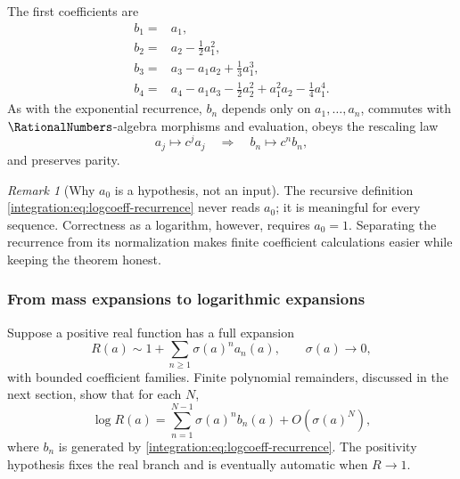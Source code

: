 \documentclass[11pt,oneside]{article}
\theoremstyle{definition}
\theoremstyle{remark}
\newtheorem{remark}[remark]{Remark}
\begin{document}
The first coefficients are
\begin{align}
 b_1={}&a_1,                                                  \label{integration:eq:b1}\\
 b_2={}&a_2-\frac12a_1^2,                                   \label{integration:eq:b2}\\
 b_3={}&a_3-a_1a_2+\frac13a_1^3,                            \label{integration:eq:b3}\\
 b_4={}&a_4-a_1a_3-\frac12a_2^2+a_1^2a_2-\frac14a_1^4.     \label{integration:eq:b4}
\end{align}
As with the exponential recurrence, $b_n$ depends only on $a_1,\ldots,a_n$, commutes with
$\RationalNumbers$-algebra morphisms and evaluation, obeys the rescaling law
\begin{equation}
 a_j\mapsto c^ja_j\quad\Longrightarrow\quad b_n\mapsto c^nb_n,
 \label{integration:eq:logcoeff-rescale}
\end{equation}
and preserves parity.

\begin{remark}[Why $a_0$ is a hypothesis, not an input]
The recursive definition \eqref{integration:eq:logcoeff-recurrence} never reads $a_0$; it is meaningful
for every sequence.  Correctness as a logarithm, however, requires $a_0=1$.  Separating the
recurrence from its normalization makes finite coefficient calculations easier while keeping
the theorem honest.
\end{remark}

\subsubsection{From mass expansions to logarithmic expansions}

Suppose a positive real function has a full expansion
\begin{equation}
 R(a)\sim1+\sum_{n\ge1}\sigma(a)^na_n(a),
 \qquad \sigma(a)\to0,
 \label{integration:eq:mass-expansion-before-log}
\end{equation}
with bounded coefficient families.  Finite polynomial remainders, discussed in the next
section, show that for each $N$,
\begin{equation}
 \log R(a)=\sum_{n=1}^{N-1}\sigma(a)^nb_n(a)+O(\sigma(a)^N),
 \label{integration:eq:log-asymptotic-transfer}
\end{equation}
where $b_n$ is generated by \eqref{integration:eq:logcoeff-recurrence}.  The positivity hypothesis fixes
the real branch and is eventually automatic when $R\to1$.
\end{document}
